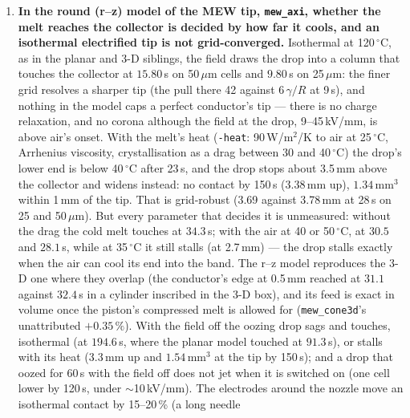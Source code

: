 \documentclass[11pt,a4paper]{article}
\newcommand{\code}[1]{\texttt{\small #1}}
\begin{document}
\begin{enumerate}[leftmargin=1.4em,itemsep=4pt]
{  the curvature.} With height functions (\code{validation/fs\_electric -hf})
  the frozen row reads $-5.5$ and $-4.4\,\%$ at $s=1$ and $2$, against
  $+9.2$ and $+19.5\,\%$ with the default curvature: no longer worse at the
  longer wavelength, and slightly soft rather than stiff. The geometric
  exchange changes it by less than half a percent. The $-4$ to $-6\,\%$ that
  remains is not diagnosed.
\item \textbf{In the round (r--z) model of the MEW tip, \code{mew\_axi},
  whether the melt reaches the collector is decided by how far it cools, and
  an isothermal electrified tip is not grid-converged.} Isothermal at
  120\,$^\circ$C, as in the planar and 3-D siblings, the field draws the drop into
  a column that touches the collector at $15.80$\,s on 50\,$\mu$m cells and
  $9.80$\,s on 25\,$\mu$m: the finer grid resolves a sharper tip (the pull there
  42 against 6\,$\gamma/R$ at 9\,s), and nothing in the model caps a perfect
  conductor's tip --- there is no charge relaxation, and no corona although the
  field at the drop, 9--45\,kV/mm, is above air's onset. With the melt's heat
  (\code{-heat}: 90\,W/m$^2$/K to air at 25\,$^\circ$C, Arrhenius viscosity,
  crystallisation as a drag between 30 and 40\,$^\circ$C) the drop's lower end is
  below 40\,$^\circ$C after 23\,s, and the drop stops about 3.5\,mm above the
  collector and widens instead: no contact by 150\,s (3.38\,mm up), $1.34$\,mm$^3$
  within 1\,mm of the tip. That is grid-robust (3.69 against 3.78\,mm at 28\,s on 25 and
  50\,$\mu$m). But every parameter that decides it is unmeasured: without the
  drag the cold melt touches at $34.3$\,s; with the air at 40 or 50\,$^\circ$C,
  at $30.5$ and $28.1$\,s, while at 35\,$^\circ$C it still stalls (at 2.7\,mm)
  --- the drop stalls exactly when the air can cool its end into the band. The
  r--z model reproduces the 3-D one where they overlap (the conductor's edge at
  0.5\,mm reached at $31.1$ against $32.4$\,s in a cylinder inscribed in the
  3-D box), and its feed is exact in volume once the piston's compressed melt
  is allowed for (\code{mew\_cone3d}'s unattributed $+0.35\,\%$).
  With the field off the oozing drop sags and touches, isothermal (at
  $194.6$\,s, where the planar model touched at $91.3$\,s), or
  stalls with its heat (3.3\,mm up and $1.54$\,mm$^3$ at the tip by 150\,s); and
  a drop that oozed for 60\,s with the field off does not jet when it is
  switched on (one cell lower by 120\,s, under $\sim$10\,kV/mm). The electrodes
  around the nozzle move an isothermal contact by 15--20\,\% (a long needle

\end{enumerate}
\end{document}
